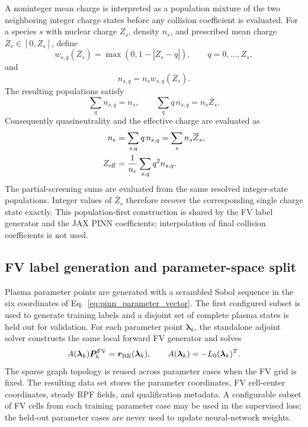 \documentclass[11pt]{article}
\begin{document}
A noninteger mean charge is interpreted as a population mixture of the two neighboring
integer charge states before any collision coefficient is evaluated.  For a species $s$
with nuclear charge $Z_s$, density $n_s$, and prescribed mean charge
$\overline Z_s\in[0,Z_s]$, define
\begin{equation}
 w_{s,q}(\overline Z_s)
 =\max\!\left(0,1-|\overline Z_s-q|\right),
 \qquad q=0,\ldots,Z_s,
 \label{eq:pinn_charge_shape_function}
\end{equation}
and
\begin{equation}
 n_{s,q}=n_s w_{s,q}(\overline Z_s).
 \label{eq:pinn_charge_population}
\end{equation}
The resulting populations satisfy
\begin{equation}
 \sum_q n_{s,q}=n_s,
 \qquad
 \sum_q q\,n_{s,q}=n_s\overline Z_s.
\end{equation}
Consequently quasineutrality and the effective charge are evaluated as
\begin{align}
 n_e&=\sum_{s,q}q\,n_{s,q}
    =\sum_s n_s\overline Z_s,
 \label{eq:pinn_quasineutrality}\\
 Z_{\rm eff}&=\frac{1}{n_e}\sum_{s,q}q^2n_{s,q}.
 \label{eq:pinn_zeff}
\end{align}
The partial-screening sums are evaluated from the same resolved integer-state
populations.  Integer values of $\overline Z_s$ therefore recover the corresponding
single charge state exactly.  This population-first construction is shared by the FV
label generator and the JAX PINN coefficients; interpolation of final collision
coefficients is not used.

\subsection{FV label generation and parameter-space split}
\label{sec:pinn_fv_labels}

Plasma parameter points are generated with a scrambled Sobol sequence in the six
coordinates of Eq.~\eqref{eq:pinn_parameter_vector}.  The first configured subset is
used to generate training labels and a disjoint set of complete plasma states is held
out for validation.  For each parameter point $\bm\lambda_k$, the standalone adjoint
solver constructs the same local forward FV generator and solves
\begin{equation}
 A(\bm\lambda_k)\bm P_k^{\rm FV}
 =\bm r_{\rm RE}(\bm\lambda_k),
 \qquad
 A(\bm\lambda_k)=-L_0(\bm\lambda_k)^T.
 \label{eq:pinn_fv_teacher_solve}
\end{equation}
The sparse graph topology is reused across parameter cases when the FV grid is fixed.
The resulting data set stores the parameter coordinates, FV cell-center coordinates,
steady RPF fields, and qualification metadata.  A configurable subset of FV cells from
each training parameter case may be used in the supervised loss; the held-out parameter
cases are never used to update neural-network weights.
\end{document}
